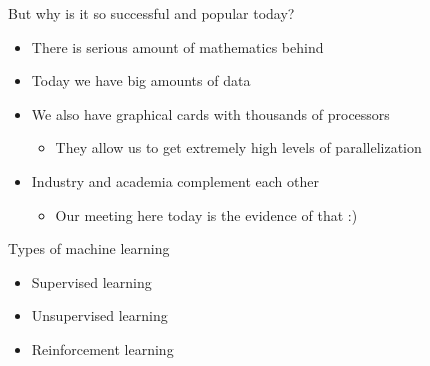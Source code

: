 \documentclass[aspectratio=169]{beamer}
\begin{document}
\begin{frame}{But why is it so successful and popular today?}
    \begin{itemize}
        \item There is serious amount of mathematics behind \cite{Murphy, Bishop, tibshirani, shalev-schwartz, vapnik}
        \item Today we have big amounts of data
        \item We also have graphical cards with thousands of processors
        \begin{itemize}
            \item They allow us to get extremely high levels of parallelization
        \end{itemize}
        \item Industry and academia complement each other
        \begin{itemize}
            \item Our meeting here today is the evidence of that :)
        \end{itemize}
    \end{itemize}
\end{frame}
\begin{frame}{Types of machine learning}
    \begin{itemize}
        \item Supervised learning
        \item Unsupervised learning
        \item Reinforcement learning
    \end{itemize}
\end{frame}
\end{document}
